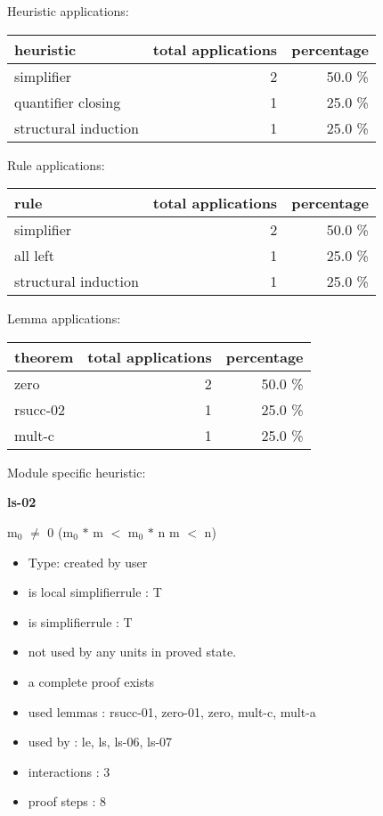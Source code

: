 \documentclass[a4paper]{article}
\begin{document}
\medskip


Heuristic applications:

\begin{supertabular}{l|r|r}
heuristic	& total applications & percentage \\ \hline
simplifier & 2 & 50.0 \% \\
quantifier closing & 1 & 25.0 \% \\
structural induction & 1 & 25.0 \% \\

\end{supertabular}

Rule applications:

\begin{supertabular}{l|r|r}
rule	        & total applications & percentage \\ \hline
simplifier & 2 & 50.0 \% \\
all left & 1 & 25.0 \% \\
structural induction & 1 & 25.0 \% \\

\end{supertabular}

Lemma applications:

\begin{supertabular}{l|r|r}
theorem	        & total applications & percentage \\ \hline
zero & 2 & 50.0 \% \\
rsucc-02 & 1 & 25.0 \% \\
mult-c & 1 & 25.0 \% \\

\end{supertabular}

Module specific heuristic:

\pagebreak

{\LARGE\bf ls-02}\label{lemma-ls-02}

\medskip

 \Fol $\mbox{m}_{0}$ $\neq$ 0 \Imp ($\mbox{m}_{0}$ $*$ m $<$ $\mbox{m}_{0}$ $*$ n \Equiv m $<$ n)

\begin{itemize}

\item Type: created by user

\item is local simplifierrule : T
\item is simplifierrule : T
\item not used by any units in proved state.
\item       a complete proof exists
\item       used lemmas  : rsucc-01, zero-01, zero, mult-c, mult-a
\item       used by      : le, ls, ls-06, ls-07
\item       interactions : 3
\item       proof steps  : 8
\end{itemize}
\end{document}
